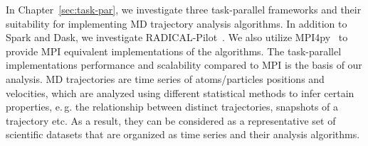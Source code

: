 In Chapter~\ref{sec:task-par}, we investigate three task-parallel frameworks and their suitability for implementing MD trajectory analysis algorithms.
In addition to Spark and Dask, we investigate RADICAL-Pilot~\cite{merzky2018design}.
We also utilize MPI4py~\cite{dalcin2005mpi} to provide MPI equivalent implementations of the algorithms.
The task-parallel implementations performance and scalability compared to MPI is the basis of our analysis.
MD trajectories are time series of atoms/particles positions and velocities, which are analyzed using different statistical methods to infer certain properties, e.\,g. the relationship between distinct trajectories, snapshots of a trajectory etc.
As a result, they can be considered as a representative set of scientific datasets that are organized as time series and their analysis algorithms. 






